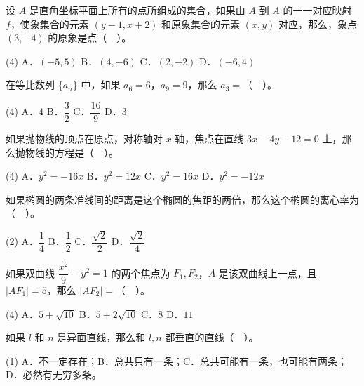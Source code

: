 \begin{question}
设 $A$ 是直角坐标平面上所有的点所组成的集合，如果由 $A$ 到 $A$ 的一一对应映射 $f$，使象集合的元素 $(y-1,x+2)$ 和原象集合的元素 $(x,y)$ 对应，那么，象点 $(3,-4)$ 的原象是点（　）。

\begin{gkopts}(4)
\task A．$(-5,5)$
\task B．$(4,-6)$
\task C．$(2,-2)$
\task D．$(-6,4)$
\end{gkopts}

\end{question}
\begin{question}
在等比数列 $\{a_n\}$ 中，如果 $a_6=6$，$a_9=9$，那么 $a_3=$（　）。

\begin{gkopts}(4)
\task A．$4$
\task B．$\dfrac32$
\task C．$\dfrac{16}9$
\task D．$3$
\end{gkopts}

\end{question}
\begin{question}
如果抛物线的顶点在原点，对称轴对 $x$ 轴，焦点在直线 $3x-4y-12=0$ 上，那么抛物线的方程是（　）。

\begin{gkopts}(4)
\task A．$y^2=-16x$
\task B．$y^2=12x$
\task C．$y^2=16x$
\task D．$y^2=-12x$
\end{gkopts}

\end{question}
\begin{question}
如果椭圆的两条准线间的距离是这个椭圆的焦距的两倍，那么这个椭圆的离心率为（　）。

\begin{gkopts}(2)
\task A．$\dfrac14$
\task B．$\dfrac12$
\task C．$\dfrac{\sqrt2}2$
\task D．$\dfrac{\sqrt2}4$
\end{gkopts}

\end{question}
\begin{question}
如果双曲线 $\dfrac{x^2}9-y^2=1$ 的两个焦点为 $F_1,F_2$，$A$ 是该双曲线上一点，且 $|AF_1|=5$，那么 $|AF_2|=$（　）。

\begin{gkopts}(4)
\task A．$5+\sqrt{10}$
\task B．$5+2\sqrt{10}$
\task C．$8$
\task D．$11$
\end{gkopts}

\end{question}
\begin{question}
如果 $l$ 和 $n$ 是异面直线，那么和 $l,n$ 都垂直的直线（　）。

\begin{gkopts}(1)
\task A．不一定存在；B．总共只有一条；C．总共可能有一条，也可能有两条；D．必然有无穷多条。
\end{gkopts}

\end{question}
